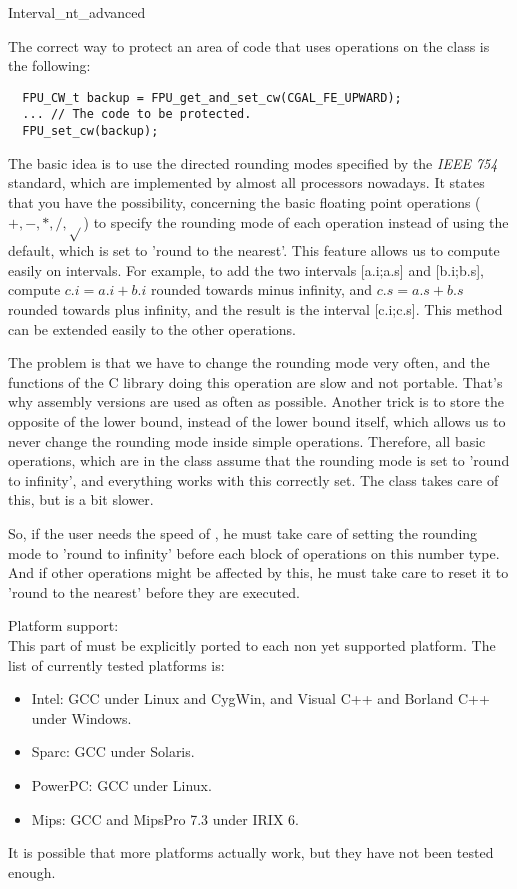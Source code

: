 \begin{ccAdvanced}
\begin{ccClass} {Interval_nt_advanced}
\ccExample

The correct way to protect an area of code that uses operations on the class
 is the following:

\begin{verbatim}
  FPU_CW_t backup = FPU_get_and_set_cw(CGAL_FE_UPWARD);
  ... // The code to be protected.
  FPU_set_cw(backup);
\end{verbatim}

\ccImplementation

The basic idea is to use the directed rounding modes specified by the 
{\it IEEE 754} standard, which are implemented by almost all processors 
nowadays.
It states that you have the possibility, concerning the basic floating point
operations ($+,-,*,/,\sqrt{}$) to specify the rounding mode of each operation
instead of using the default, which is set to 'round to the nearest'.
This feature allows us to compute easily on intervals.  For example, to
add the two intervals [a.i;a.s] and [b.i;b.s], compute $c.i=a.i+b.i$ rounded
towards minus infinity, and $c.s=a.s+b.s$ rounded towards plus infinity, and
the result is the interval [c.i;c.s].  This method can be extended easily to
the other operations.

The problem is that we have to change the rounding mode very often, and the
functions of the C library doing this operation are slow and not portable.
That's why assembly versions are used as often as possible.
Another trick is to store the opposite of the lower bound, instead of the
lower bound itself, which allows us to never change the rounding mode inside
simple operations.  Therefore, all basic operations, which are in the class 
 assume that the rounding mode is set to 
'round to infinity', and everything works with this correctly set.  
The class  takes care of this, but is a bit slower.

So, if the user needs the speed of , he must
take care of setting the rounding mode to 'round to infinity' before each
block of operations on this number type.  And if other operations might be
affected by this, he must take care to reset it to 'round to the nearest'
before they are executed.


Platform support:\\
This part of {\cgal} must be explicitly ported to each non yet supported
platform.  The list of currently tested platforms is:
\begin{itemize}
\item Intel: GCC under Linux and CygWin, and Visual C++ and Borland C++ under
      Windows.
\item Sparc: GCC under Solaris.
\item PowerPC: GCC under Linux.
\item Mips: GCC and MipsPro 7.3 under IRIX 6.
\end{itemize}
It is possible that more platforms actually work, but they have not been
tested enough.


\end{ccClass}
\end{ccAdvanced}
